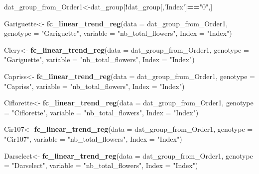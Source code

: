 \documentclass[]{article}
\newenvironment{Shaded}{\begin{snugshade}}{\end{snugshade}}
\newcommand{\KeywordTok}[1]{\textcolor[rgb]{0.13,0.29,0.53}{\textbf{#1}}}
\newcommand{\DataTypeTok}[1]{\textcolor[rgb]{0.13,0.29,0.53}{#1}}
\newcommand{\StringTok}[1]{\textcolor[rgb]{0.31,0.60,0.02}{#1}}
\newcommand{\OperatorTok}[1]{\textcolor[rgb]{0.81,0.36,0.00}{\textbf{#1}}}
\newcommand{\NormalTok}[1]{#1}
\begin{document}
\begin{Shaded}
\begin{Highlighting}[]
\NormalTok{dat_group_from_Order1<-dat_group[}\OperatorTok{!}\NormalTok{dat_group[,}\StringTok{'Index'}\NormalTok{]}\OperatorTok{==}\StringTok{"0"}\NormalTok{,]}

\NormalTok{Gariguette<-}\StringTok{ }\KeywordTok{fc_linear_trend_reg}\NormalTok{(}\DataTypeTok{data =}\NormalTok{ dat_group_from_Order1,}
                                 \DataTypeTok{genotype =} \StringTok{"Gariguette"}\NormalTok{,}
                                 \DataTypeTok{variable =} \StringTok{"nb_total_flowers"}\NormalTok{,}
                                 \DataTypeTok{Index =} \StringTok{"Index"}\NormalTok{)}

\NormalTok{Clery<-}\StringTok{ }\KeywordTok{fc_linear_trend_reg}\NormalTok{(}\DataTypeTok{data =}\NormalTok{ dat_group_from_Order1,}
                            \DataTypeTok{genotype =} \StringTok{"Gariguette"}\NormalTok{,}
                            \DataTypeTok{variable =} \StringTok{"nb_total_flowers"}\NormalTok{,}
                            \DataTypeTok{Index =} \StringTok{"Index"}\NormalTok{)}

\NormalTok{Capriss<-}\StringTok{ }\KeywordTok{fc_linear_trend_reg}\NormalTok{(}\DataTypeTok{data =}\NormalTok{ dat_group_from_Order1,}
                              \DataTypeTok{genotype =} \StringTok{"Capriss"}\NormalTok{,}
                              \DataTypeTok{variable =} \StringTok{"nb_total_flowers"}\NormalTok{,}
                              \DataTypeTok{Index =} \StringTok{"Index"}\NormalTok{)}

\NormalTok{Ciflorette<-}\StringTok{ }\KeywordTok{fc_linear_trend_reg}\NormalTok{(}\DataTypeTok{data =}\NormalTok{ dat_group_from_Order1,}
                                 \DataTypeTok{genotype =} \StringTok{"Ciflorette"}\NormalTok{,}
                                 \DataTypeTok{variable =} \StringTok{"nb_total_flowers"}\NormalTok{,}
                                 \DataTypeTok{Index =} \StringTok{"Index"}\NormalTok{)}

\NormalTok{Cir107<-}\StringTok{ }\KeywordTok{fc_linear_trend_reg}\NormalTok{(}\DataTypeTok{data =}\NormalTok{ dat_group_from_Order1,}
                             \DataTypeTok{genotype =} \StringTok{"Cir107"}\NormalTok{,}
                             \DataTypeTok{variable =} \StringTok{"nb_total_flowers"}\NormalTok{,}
                             \DataTypeTok{Index =} \StringTok{"Index"}\NormalTok{)}

\NormalTok{Darselect<-}\StringTok{ }\KeywordTok{fc_linear_trend_reg}\NormalTok{(}\DataTypeTok{data =}\NormalTok{ dat_group_from_Order1,}
                                \DataTypeTok{genotype =} \StringTok{"Darselect"}\NormalTok{,}
                                \DataTypeTok{variable =} \StringTok{"nb_total_flowers"}\NormalTok{,}
                                \DataTypeTok{Index =} \StringTok{"Index"}\NormalTok{)}


\end{Highlighting}
\end{Shaded}
\end{document}
